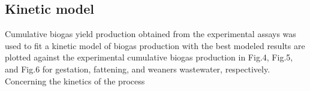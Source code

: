 \subsection{Kinetic model}
Cumulative biogas yield production obtained from the experimental assays was used to fit a kinetic model of biogas production with the best modeled results are plotted against the experimental cumulative biogas production in Fig.4, Fig.5, and Fig.6 for gestation, fattening, and weaners wastewater, respectively.
Concerning the kinetics of the process